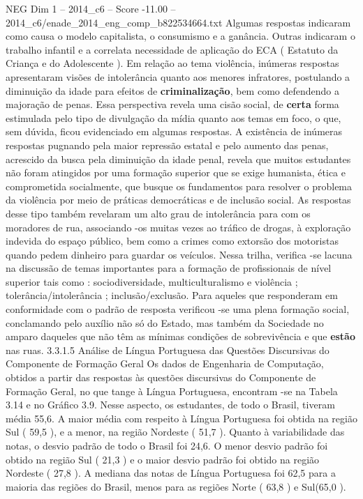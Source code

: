 \begin{textsample}{NEG Dim 1 – 2014\_c6 – Score -11.00 – 2014\_c6/enade\_2014\_eng\_comp\_b822534664.txt}
Algumas respostas indicaram como causa o modelo capitalista, o consumismo e a ganância.
Outras indicaram o trabalho infantil e a correlata necessidade de aplicação do ECA ( Estatuto da Criança e do Adolescente ).
Em relação ao tema violência, inúmeras respostas apresentaram visões de intolerância quanto aos menores infratores, postulando a diminuição da idade para efeitos de \textbf{criminalização}, bem como defendendo a majoração de penas.
Essa perspectiva revela uma cisão social, de \textbf{certa} forma estimulada pelo tipo de divulgação da mídia quanto aos temas em foco, o que, sem dúvida, ficou evidenciado em algumas respostas.
A existência de inúmeras respostas pugnando pela maior repressão estatal e pelo aumento das penas, acrescido da busca pela diminuição da idade penal, revela que muitos estudantes não foram atingidos por uma formação superior que se exige humanista, ética e comprometida socialmente, que busque os fundamentos para resolver o problema da violência por meio de práticas democráticas e de inclusão social.
As respostas desse tipo também revelaram um alto grau de intolerância para com os moradores de rua, associando -os muitas vezes ao tráfico de drogas, à exploração indevida do espaço público, bem como a crimes como extorsão dos motoristas quando pedem dinheiro para guardar os veículos.
Nessa trilha, verifica -se lacuna na discussão de temas importantes para a formação de profissionais de nível superior tais como : sociodiversidade, multiculturalismo e violência ; tolerância/intolerância ; inclusão/exclusão.
Para aqueles que responderam em conformidade com o padrão de resposta verificou -se uma plena formação social, conclamando pelo auxílio não só do Estado, mas também da Sociedade no amparo daqueles que não têm as mínimas condições de sobrevivência e que \textbf{estão} nas ruas. 3.3.1.5 Análise de Língua Portuguesa das Questões Discursivas do Componente de Formação Geral Os dados de Engenharia de Computação, obtidos a partir das respostas às questões discursivas do Componente de Formação Geral, no que tange à Língua Portuguesa, encontram -se na Tabela 3.14 e no Gráfico 3.9.
Nesse aspecto, os estudantes, de todo o Brasil, tiveram média 55,6.
A maior média com respeito à Língua Portuguesa foi obtida na região Sul ( 59,5 ), e a menor, na região Nordeste ( 51,7 ).
Quanto à variabilidade das notas, o desvio padrão de todo o Brasil foi 24,6.
O menor desvio padrão foi obtido na região Sul ( 21,3 ) e o maior desvio padrão foi obtido na região Nordeste ( 27,8 ).
A mediana das notas de Língua Portuguesa foi 62,5 para a maioria das regiões do Brasil, menos para as regiões Norte ( 63,8 ) e Sul(65,0 ).

\end{textsample}
